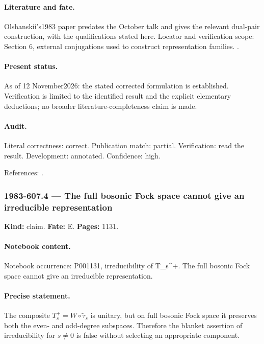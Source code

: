 \paragraph{Literature and fate.} Olshanskii's1983 paper predates the October talk and gives the relevant dual-pair construction, with the qualifications stated here. Locator and verification scope: Section 6, external conjugations used to construct representation families. \cite{olshanskii1983pairs}.

\paragraph{Present status.} As of 12 November2026: the stated corrected formulation is established. Verification is limited to the identified result and the explicit elementary deductions; no broader literature-completeness claim is made.

\paragraph{Audit.} Literal correctness: correct. Publication match: partial. Verification: read the result. Development: annotated. Confidence: high.

\noindent References: \citep{olshanskii1983pairs}.\par

\subsubsection{1983-607.4 --- The full bosonic Fock space cannot give an irreducible representation}

\label{item:1983-607.4}

\noindent\textbf{Kind:} claim. \textbf{Fate:} E. \textbf{Pages:} 1131.\par

\paragraph{Notebook content.} Notebook occurrence: P001131, irreducibility of T_s^+. The full bosonic Fock space cannot give an irreducible representation.

\paragraph{Precise statement.} The composite \(T_s^+=W\circ\widetilde\tau_s\) is unitary, but on full bosonic Fock space it preserves both the even- and odd-degree subspaces. Therefore the blanket assertion of irreducibility for \(s\ne0\) is false without selecting an appropriate component.

